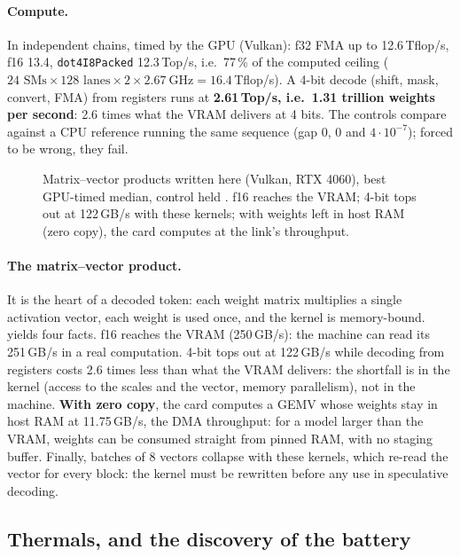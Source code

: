 \paragraph{Compute.} In independent chains, timed by the GPU (Vulkan): f32 FMA up to 12.6\,Tflop/s, f16 13.4, \texttt{dot4I8Packed} 12.3\,Top/s, i.e.\ 77\,\% of the computed ceiling ($24 \text{ SMs} \times 128 \text{ lanes} \times 2 \times \SI{2.67}{\giga\hertz} = 16.4$\,Tflop/s). A 4-bit decode (shift, mask, convert, FMA) from registers runs at \textbf{2.61\,Top/s, i.e.\ 1.31 trillion weights per second}: 2.6 times what the VRAM delivers at 4 bits. The controls compare against a CPU reference running the same sequence (gap 0, 0 and $4\cdot10^{-7}$); forced to be wrong, they fail.

\begin{figure}[ht]
\centering
\GrapheGEMV
\caption[Matrix--vector products written here, on the RTX 4060]{Matrix--vector products written here (Vulkan, RTX 4060), best GPU-timed median, control held \mes. f16 reaches the VRAM; 4-bit tops out at 122\,GB/s with these kernels; with weights left in host RAM (zero copy), the card computes at the link's throughput.}
\label{fig:gemv-machine}
\end{figure}

\paragraph{The matrix--vector product.} It is the heart of a decoded token: each weight matrix multiplies a single activation vector, each weight is used once, and the kernel is memory-bound.  yields four facts. f16 reaches the VRAM (250\,GB/s): the machine can read its 251\,GB/s in a real computation. 4-bit tops out at 122\,GB/s while decoding from registers costs 2.6 times less than what the VRAM delivers: the shortfall is in the kernel (access to the scales and the vector, memory parallelism), not in the machine. \textbf{With zero copy}, the card computes a GEMV whose weights stay in host RAM at 11.75\,GB/s, the DMA throughput: for a model larger than the VRAM, weights can be consumed straight from pinned RAM, with no staging buffer. Finally, batches of 8 vectors collapse with these kernels, which re-read the vector for every block: the kernel must be rewritten before any use in speculative decoding.

\subsection{Thermals, and the discovery of the battery}\label{sec:batterie}

